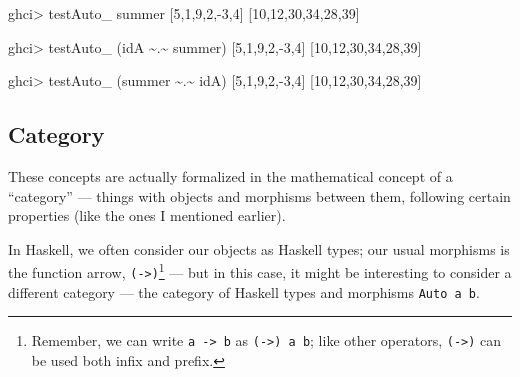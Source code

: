 \documentclass[]{article}
\newenvironment{Shaded}{}{}
\newcommand{\DecValTok}[1]{\textcolor[rgb]{0.25,0.63,0.44}{#1}}
\newcommand{\NormalTok}[1]{#1}
\newcommand{\OperatorTok}[1]{\textcolor[rgb]{0.40,0.40,0.40}{#1}}
\begin{document}
\begin{Shaded}
\begin{Highlighting}[]
\NormalTok{ghci}\OperatorTok{>}\NormalTok{ testAuto\_ summer [}\DecValTok{5}\NormalTok{,}\DecValTok{1}\NormalTok{,}\DecValTok{9}\NormalTok{,}\DecValTok{2}\NormalTok{,}\OperatorTok{{-}}\DecValTok{3}\NormalTok{,}\DecValTok{4}\NormalTok{]}
\NormalTok{[}\DecValTok{10}\NormalTok{,}\DecValTok{12}\NormalTok{,}\DecValTok{30}\NormalTok{,}\DecValTok{34}\NormalTok{,}\DecValTok{28}\NormalTok{,}\DecValTok{39}\NormalTok{]}

\NormalTok{ghci}\OperatorTok{>}\NormalTok{ testAuto\_ (idA }\OperatorTok{\textasciitilde{}.\textasciitilde{}}\NormalTok{ summer) [}\DecValTok{5}\NormalTok{,}\DecValTok{1}\NormalTok{,}\DecValTok{9}\NormalTok{,}\DecValTok{2}\NormalTok{,}\OperatorTok{{-}}\DecValTok{3}\NormalTok{,}\DecValTok{4}\NormalTok{]}
\NormalTok{[}\DecValTok{10}\NormalTok{,}\DecValTok{12}\NormalTok{,}\DecValTok{30}\NormalTok{,}\DecValTok{34}\NormalTok{,}\DecValTok{28}\NormalTok{,}\DecValTok{39}\NormalTok{]}

\NormalTok{ghci}\OperatorTok{>}\NormalTok{ testAuto\_ (summer }\OperatorTok{\textasciitilde{}.\textasciitilde{}}\NormalTok{ idA) [}\DecValTok{5}\NormalTok{,}\DecValTok{1}\NormalTok{,}\DecValTok{9}\NormalTok{,}\DecValTok{2}\NormalTok{,}\OperatorTok{{-}}\DecValTok{3}\NormalTok{,}\DecValTok{4}\NormalTok{]}
\NormalTok{[}\DecValTok{10}\NormalTok{,}\DecValTok{12}\NormalTok{,}\DecValTok{30}\NormalTok{,}\DecValTok{34}\NormalTok{,}\DecValTok{28}\NormalTok{,}\DecValTok{39}\NormalTok{]}
\end{Highlighting}
\end{Shaded}

\hypertarget{category}{%
\subsection{Category}\label{category}}

These concepts are actually formalized in the mathematical concept of a
``category'' --- things with objects and morphisms between them, following
certain properties (like the ones I mentioned earlier).

In Haskell, we often consider our objects as Haskell types; our usual morphisms
is the function arrow, \texttt{(-\textgreater{})}\footnote{Remember, we can
  write \texttt{a\ -\textgreater{}\ b} as \texttt{(-\textgreater{})\ a\ b}; like
  other operators, \texttt{(-\textgreater{})} can be used both infix and prefix.}
--- but in this case, it might be interesting to consider a different category
--- the category of Haskell types and morphisms \texttt{Auto\ a\ b}.
\end{document}
